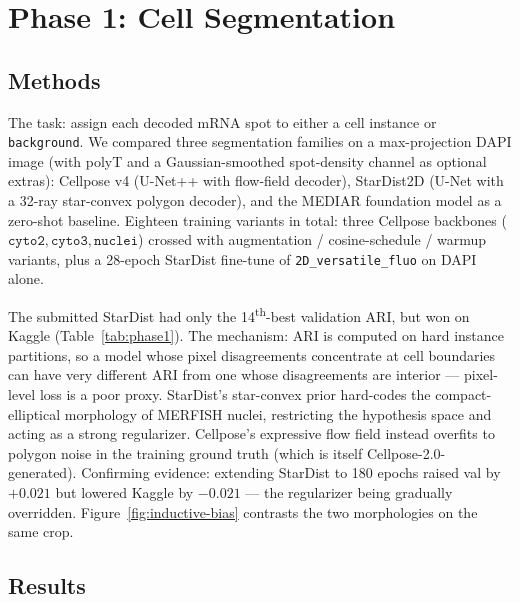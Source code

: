 \documentclass[a4paper,11pt]{article}
\begin{document}
\section{Phase 1: Cell Segmentation}
\label{sec:phase1}

\subsection{Methods}
\label{subsec:why-stardist}

The task: assign each decoded mRNA spot to either a cell instance or \texttt{background}. We compared three segmentation families on a max-projection DAPI image (with polyT and a Gaussian-smoothed spot-density channel as optional extras): Cellpose v4 \cite{stringer2021cellpose} (U-Net++ with flow-field decoder), StarDist2D \cite{schmidt2018cell} (U-Net with a 32-ray star-convex polygon decoder), and the MEDIAR \cite{lee2022mediar} foundation model as a zero-shot baseline. Eighteen training variants in total: three Cellpose backbones ($\texttt{cyto2}, \texttt{cyto3}, \texttt{nuclei}$) crossed with augmentation / cosine-schedule / warmup variants, plus a 28-epoch StarDist fine-tune of \texttt{2D\_versatile\_fluo} on DAPI alone.

The submitted StarDist had only the 14\textsuperscript{th}-best validation ARI, but won on Kaggle (Table~\ref{tab:phase1}). The mechanism: ARI is computed on hard instance partitions, so a model whose pixel disagreements concentrate at cell boundaries can have very different ARI from one whose disagreements are interior --- pixel-level loss is a poor proxy. StarDist's star-convex prior hard-codes the compact-elliptical morphology of MERFISH nuclei, restricting the hypothesis space and acting as a strong regularizer. Cellpose's expressive flow field instead overfits to polygon noise in the training ground truth (which is itself Cellpose-2.0-generated). Confirming evidence: extending StarDist to 180 epochs raised val by $+0.021$ but lowered Kaggle by $-0.021$ --- the regularizer being gradually overridden. Figure~\ref{fig:inductive-bias} contrasts the two morphologies on the same crop.

\subsection{Results}
\end{document}
